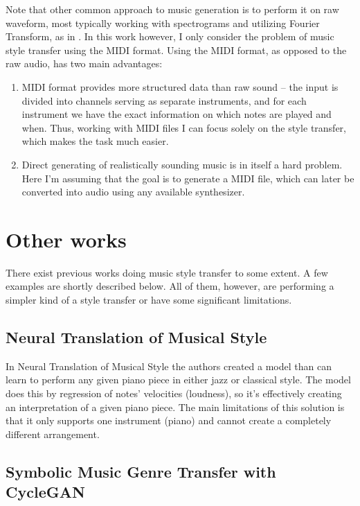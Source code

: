 \documentclass[en]{pracamgr}
\begin{document}
Note that other common approach to music generation is to perform it on raw waveform, most typically working with spectrograms and utilizing Fourier Transform, as in \cite{music_generation}.
In this work however, I only consider the problem of music style transfer using the MIDI format.
Using the MIDI format, as opposed to the raw audio, has two main advantages:

\begin{enumerate}
    \item
    MIDI format provides more structured data than raw sound -- the input is divided into channels serving as separate instruments, and for each instrument we have the exact information on which notes are played and when.
    Thus, working with MIDI files I can focus solely on the style transfer, which makes the task much easier.
    \item
    Direct generating of realistically sounding music is in itself a hard problem.
    Here I'm assuming that the goal is to generate a MIDI file, which can later be converted into audio using any available synthesizer.
\end{enumerate}

\section{Other works}

There exist previous works doing music style transfer to some extent.
A few examples are shortly described below.
All of them, however, are performing a simpler kind of a style transfer or have some significant limitations.

\subsection{Neural Translation of Musical Style}

In Neural Translation of Musical Style \cite{neural_translation} the authors created a model than can learn to perform any given piano piece in either jazz or classical style.
The model does this by regression of notes' velocities (loudness), so it's effectively creating an interpretation of a given piano piece.
The main limitations of this solution is that it only supports one instrument (piano) and cannot create a completely different arrangement.

\subsection{Symbolic Music Genre Transfer with CycleGAN}
\end{document}
